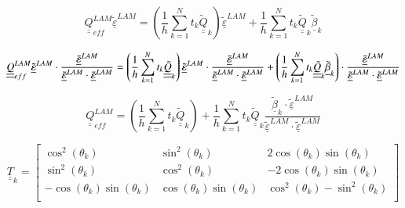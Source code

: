 \documentclass[review]{elsarticle}
\begin{document}
\begin{equation}
\underline{\underline{Q}}_{eff}^{LAM}\underline{\tilde{\varepsilon}}^{LAM}=\left(\frac{1}{h}\sum_{k=1}^{N}t_{k}\underline{\underline{\tilde{Q}}}_{k}\right)\underline{\tilde{\varepsilon}}^{LAM}+\frac{1}{h}\sum_{k=1}^{N}t_{k}\underline{\underline{\tilde{Q}}}_{k}\underline{\tilde{\beta}}_{k}
\end{equation}

\begin{equation}
\footnotesize
\underline{\underline{Q}}_{eff}^{LAM}\underline{\tilde{\varepsilon}}^{LAM}\cdot\frac{\underline{\tilde{\varepsilon}}^{LAM}}{\underline{\tilde{\varepsilon}}^{LAM}\cdot\underline{\tilde{\varepsilon}}^{LAM}}=\left(\frac{1}{h}\sum_{k=1}^{N}t_{k}\underline{\underline{\tilde{Q}}}_{k}\right)\underline{\tilde{\varepsilon}}^{LAM}\cdot\frac{\underline{\tilde{\varepsilon}}^{LAM}}{\underline{\tilde{\varepsilon}}^{LAM}\cdot\underline{\tilde{\varepsilon}}^{LAM}}+\left(\frac{1}{h}\sum_{k=1}^{N}t_{k}\underline{\underline{\tilde{Q}}}_{k}\underline{\tilde{\beta}}_{k}\right)\cdot\frac{\underline{\tilde{\varepsilon}}^{LAM}}{\underline{\tilde{\varepsilon}}^{LAM}\cdot\underline{\tilde{\varepsilon}}^{LAM}}
\end{equation}

\begin{equation}
\underline{\underline{Q}}_{eff}^{LAM}=\left(\frac{1}{h}\sum_{k=1}^{N}t_{k}\underline{\underline{\tilde{Q}}}_{k}\right)+\frac{1}{h}\sum_{k=1}^{N}t_{k}\underline{\underline{\tilde{Q}}}_{k}\frac{\underline{\tilde{\beta}}_{k}\cdot\underline{\tilde{\varepsilon}}^{LAM}}{\underline{\tilde{\varepsilon}}^{LAM}\cdot\underline{\tilde{\varepsilon}}^{LAM}}
\end{equation}

\begin{equation}
\underline{\underline{T}}_{k}=\begin{bmatrix}
\cos^{2}\left(\theta_{k}\right)&\sin^{2}\left(\theta_{k}\right)&2\cos\left(\theta_{k}\right)\sin\left(\theta_{k}\right)\\
\sin^{2}\left(\theta_{k}\right)&\cos^{2}\left(\theta_{k}\right)&-2\cos\left(\theta_{k}\right)\sin\left(\theta_{k}\right)\\
-\cos\left(\theta_{k}\right)\sin\left(\theta_{k}\right)&\cos\left(\theta_{k}\right)\sin\left(\theta_{k}\right)&\cos^{2}\left(\theta_{k}\right)-\sin^{2}\left(\theta_{k}\right)\\
\end{bmatrix}
\end{equation}
\end{document}
